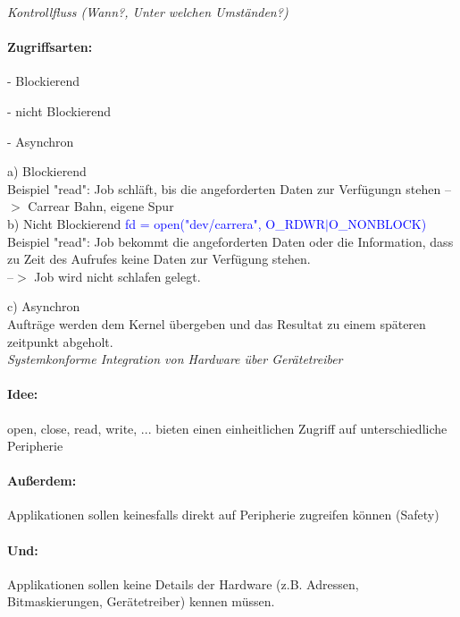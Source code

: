\documentclass[12pt,a4paper,oneside,ngerman]{article}
\begin{document}
\emph{Kontrollfluss (Wann?, Unter welchen Umständen?)}\\
\paragraph{Zugriffsarten:}
\begin{description}
	\item - Blockierend
	\item - nicht Blockierend
	\item - Asynchron
\end{description}

a) Blockierend\\
Beispiel "read": Job schläft, bis die angeforderten Daten zur Verfügungn stehen --$>$ Carrear Bahn, eigene Spur\\

b) Nicht Blockierend \textcolor{blue}{fd = open("dev/carrera", O\_RDWR$|$O\_NONBLOCK)} \\
Beispiel "read": Job bekommt die angeforderten Daten oder die Information, dass zu Zeit des Aufrufes keine Daten zur Verfügung stehen.\\
--$>$ Job wird nicht schlafen gelegt.

c) Asynchron\\
Aufträge werden dem Kernel übergeben und das Resultat zu einem späteren zeitpunkt abgeholt.\\

\emph{Systemkonforme Integration von Hardware über Gerätetreiber}\\
\paragraph{Idee:}
open, close, read, write, ... bieten einen einheitlichen Zugriff auf unterschiedliche Peripherie
\paragraph{Außerdem:}
Applikationen sollen keinesfalls direkt auf Peripherie zugreifen können (Safety)
\paragraph{Und:}
Applikationen sollen keine Details der Hardware (z.B. Adressen, Bitmaskierungen, Gerätetreiber) kennen müssen.
\end{document}
